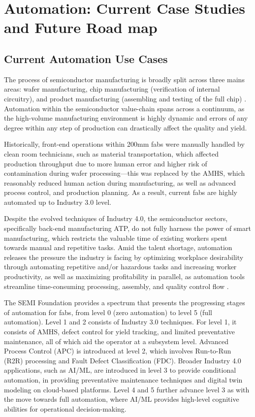 \section{Automation: Current Case Studies and Future Road map}\label{sec7:case_studies}
\subsection{Current Automation Use Cases }\label{sec6_1:current_automation}

The process of semiconductor manufacturing is broadly split across three mains areas: 
wafer manufacturing, chip manufacturing (verification of internal circuitry), and product manufacturing (assembling and testing of the full chip) \cite{Liao2010-rz}. Automation within the semiconductor value-chain spans across a continuum, as the high-volume manufacturing environment is highly dynamic and errors of any degree within any step of production can drastically affect the quality and yield. 

Historically, front-end operations within 200mm fabs were manually handled by clean room technicians, such as material transportation, which affected production throughput due to more human error and higher risk of contamination during wafer processing—this was replaced by the AMHS, which reasonably reduced human action during manufacturing, as well as advanced process control, and production planning. As a result, current fabs are highly automated up to Industry 3.0 level.

Despite the evolved techniques of Industry 4.0, the semiconductor sectors, specifically back-end manufacturing ATP, do not fully harness the power of smart manufacturing, which restricts the valuable time of existing workers spent towards manual and repetitive tasks. Amid the talent shortage, automation releases the pressure the industry is facing by optimizing workplace desirability through automating repetitive and/or hazardous tasks and increasing worker productivity, as well as maximizing profitability in parallel, as automation tools streamline time-consuming processing, assembly, and quality control flow \cite{Alam2023-hc}.

 The SEMI Foundation \cite{Hanny_undated-fl} provides a spectrum that presents the progressing stages of automation for fabs, from level 0 (zero automation) to level 5 (full automation). Level 1 and 2 consists of Industry 3.0 techniques. For level 1, it consists of AMHS, defect control for yield tracking, and limited preventative maintenance, all of which aid the operator at a subsystem level. Advanced Process Control (APC) is introduced at level 2, which involves Run-to-Run (R2R) processing and Fault Defect Classification (FDC). Broader Industry 4.0 applications, such as AI/ML, are introduced in level 3 to provide conditional automation, in providing preventative maintenance techniques and digital twin modeling on cloud-based platforms. Level 4 and 5 further advance level 3 as with the move towards full automation, where AI/ML provides high-level cognitive abilities for operational decision-making.

